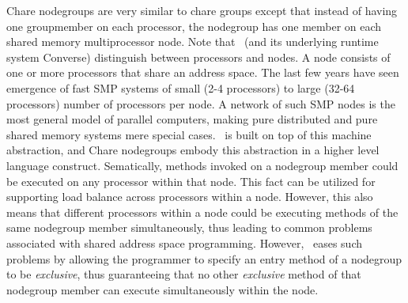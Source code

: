 Chare nodegroups are very similar to chare groups except that instead of having
one groupmember on each processor, the nodegroup has one member on each shared
memory multiprocessor node. Note that \charmpp\ (and its underlying runtime
system Converse) distinguish between processors and nodes. A node consists of
one or more processors that share an address space. The last few years have
seen emergence of fast SMP systems of small (2-4 processors) to large (32-64
processors) number of processors per node. A network of such SMP nodes is the
most general model of parallel computers, making pure distributed and pure
shared memory systems mere special cases. \charmpp\ is built on top of this
machine abstraction, and Chare nodegroups embody this abstraction in a higher
level language construct. Sematically, methods invoked on a nodegroup member
could be executed on any processor within that node. This fact can be utilized
for supporting load balance across processors within a node. However, this also
means that different processors within a node could be executing methods of the
same nodegroup member simultaneously, thus leading to common problems
associated with shared address space programming. However, \charmpp\ eases such
problems by allowing the programmer to specify an entry method of a nodegroup
to be {\em exclusive}, thus guaranteeing that no other {\em exclusive} method
of that nodegroup member can execute simultaneously within the node.

